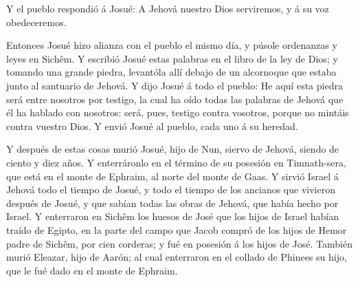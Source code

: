  Y el pueblo respondió á Josué: A Jehová nuestro Dios
serviremos, y á su voz obedeceremos.

 Entonces Josué hizo alianza con el pueblo el mismo día, y
púsole ordenanzas y leyes en Sichêm.  Y escribió Josué
estas palabras en el libro de la ley de Dios; y tomando una grande
piedra, levantóla allí debajo de un alcornoque que estaba junto al
santuario de Jehová.  Y dijo Josué á todo el pueblo: He
aquí esta piedra será entre nosotros por testigo, la cual ha oído todas
las palabras de Jehová que él ha hablado con nosotros: será, pues,
testigo contra vosotros, porque no mintáis contra vuestro Dios.
 Y envió Josué al pueblo, cada uno á su heredad.

 Y después de estas cosas murió Josué, hijo de Nun, siervo
de Jehová, siendo de ciento y diez años.  Y enterráronlo en
el término de su posesión en Timnath-sera, que está en el monte de
Ephraim, al norte del monte de Gaas.  Y sirvió Israel á
Jehová todo el tiempo de Josué, y todo el tiempo de los ancianos que
vivieron después de Josué, y que sabían todas las obras de Jehová, que
había hecho por Israel.  Y enterraron en Sichêm los huesos
de José que los hijos de Israel habían traído de Egipto, en la parte del
campo que Jacob compró de los hijos de Hemor padre de Sichêm, por cien
corderas; y fué en posesión á los hijos de José.  También
murió Eleazar, hijo de Aarón; al cual enterraron en el collado de
Phinees su hijo, que le fué dado en el monte de Ephraim.
